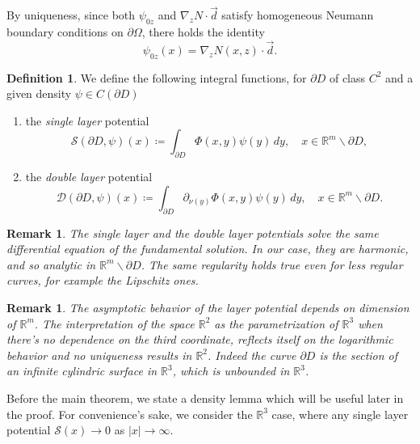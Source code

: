 \documentclass[10pt, a4paper, twoside, openright]{book}
\theoremstyle{definition}
\newtheorem{definition}[subsection]{Definition}
\theoremstyle{plain}
\theoremstyle{plain}
\theoremstyle{plain}
\theoremstyle{plain}
\newtheorem{remark}[subsection]{Remark}
\theoremstyle{plain}
\theoremstyle{plain}
\theoremstyle{plain}
\theoremstyle{plain}
\begin{document}
 By uniqueness, since both $\psi_{0z}$ and $\nabla_zN \cdot\vec{d}$ satisfy homogeneous Neumann
 boundary conditions  on $\partial \Omega$, there holds the identity
 \begin{equation}
  \psi_{0z}(x) = \nabla_zN(x,z) \cdot \vec{d}.
 \end{equation}
 \begin{definition}
 We define the following integral functions, for $\partial D$ of class $C^2$ and a given density $\psi\in C(\partial D)$
 \begin{enumerate}
  \item the \emph{single layer} potential
   \begin{equation}
    \mathcal{S}(\partial D,\psi)(x)\coloneqq \int_{\partial D} \Phi(x, y)\psi(y)\, dy,\quad x\in\mathbb{R}^m \backslash\partial D, \label{eq:definition-single-layer}
   \end{equation}
  \item the \emph{double layer} potential
   \begin{equation}
    \mathcal{D}(\partial D,\psi)(x)\coloneqq \int_{\partial D} \partial_{\nu(y)}\Phi(x, y)\psi(y)\, dy,\quad x\in\mathbb{R}^m \backslash\partial D. \label{eq:definition-double-layer}
   \end{equation}
 \end{enumerate}
\end{definition}
\begin{remark}
The single layer and the double layer potentials solve the same differential equation of the fundamental solution. In our case, they are harmonic, and so analytic in $\mathbb{R}^m\backslash \partial D$. The same regularity holds true even for less regular curves, for example the Lipschitz ones.
\end{remark}
\begin{remark}
\label{rem:dimension}
The asymptotic behavior of the layer potential depends on dimension of $\mathbb{R}^m$.
The interpretation of the space $\mathbb{R}^2$ as the parametrization of $\mathbb{R}^3$ 
when there's no dependence on the third coordinate, reflects itself on the logarithmic 
behavior and no uniqueness results in $\mathbb{R}^2$. Indeed the curve $\partial D$ is the section of an infinite cylindric surface in $\mathbb{R}^3$, which is unbounded in $\mathbb{R}^3$.
\end{remark}
 Before the main theorem, we state a density lemma which will be useful later in the proof. For convenience's sake, we consider the $\mathbb{R}^3$ case, 
 where any single layer potential $\mathcal{S}(x)\to0$ as $|x|\to \infty$.
\end{document}
